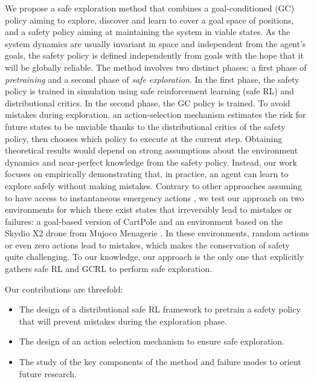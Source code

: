 We propose a safe exploration method that combines a goal-conditioned (GC) policy aiming to explore, discover and 
learn to cover a goal space of positions, and a safety policy aiming at maintaining the system in viable states. As the system dynamics are usually invariant in space and independent from the agent's goals, the safety policy
is defined independently from goals with the hope that it will be globally reliable. The method involves two distinct phases: a first phase of \textit{pretraining}
and a second phase of \textit{safe exploration}. In the first phase, the safety policy is trained in simulation 
using safe reinforcement learning (safe RL) and distributional critics. In the second phase, the GC policy is
trained. To avoid mistakes during exploration, an action-selection mechanism estimates the risk for future states to be 
unviable thanks to the distributional critics of the safety policy, then chooses which policy to execute at the current step. 
Obtaining theoretical results would depend on strong assumptions about the environment dynamics and near-perfect knowledge from the safety policy. Instead, our work focuses on empirically demonstrating that, in practice, an agent can learn to explore safely without making mistakes.
Contrary to other approaches assuming
to have access to instantaneous emergency actions \cite{MASESafeExp,dalal2018safetyLayer}, 
we test our approach on two environments for which there exist states that 
irreversibly lead to mistakes or failures: a goal-based version of CartPole and an environment based on the Skydio X2 drone from Mujoco Menagerie
\cite{towers2024gymnasium,menagerie2022github}. In these environments, random actions or even zero actions lead to mistakes, which makes the conservation of safety quite challenging. To our knowledge, our approach is the only one that explicitly gathers safe RL and GCRL to perform safe exploration.

Our contributions are threefold:
\begin{itemize}
    \item The design of a distributional safe RL framework to pretrain a safety policy that will prevent mistakes during the exploration phase.
    \item The design of an action selection mechanism to ensure safe exploration.
    \item The study of the key components of the method and failure modes to orient future research.
\end{itemize} 


